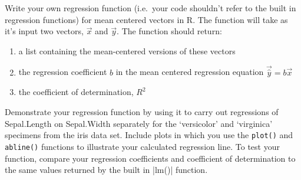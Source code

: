 \begin{assignment}
Write your own regression function (i.e.~your
code shouldn't refer to the built in regression functions) for mean
centered vectors in R. The function will take as it's input two vectors,
$\vec{x}$ and $\vec{y}$. The function should return:

\begin{enumerate}[1.]
\item
  a list containing the mean-centered versions of these vectors
\item
  the regression coefficient $b$ in the mean centered regression
  equation $\vec{\widehat{y}} = b\vec{x}$
\item
  the coefficient of determination, $R^2$
\end{enumerate}
Demonstrate your regression function by using it to carry out
regressions of Sepal.Length on Sepal.Width separately for the `versicolor'
and `virginica' specimens from the iris data set. Include plots in which you use the
\lstinline!plot()! and \lstinline!abline()! functions to illustrate your
calculated regression line. To test your function, compare your regression coefficients and coefficient of determination to the same values returned by the built in |lm()| function.

\end{assignment}



